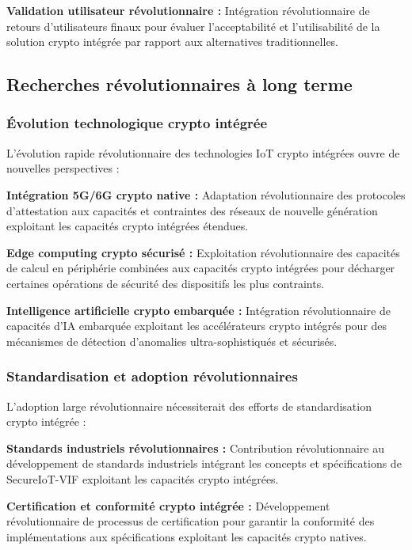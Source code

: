 \textbf{Validation utilisateur révolutionnaire :} Intégration révolutionnaire de retours d'utilisateurs finaux pour évaluer l'acceptabilité et l'utilisabilité de la solution crypto intégrée par rapport aux alternatives traditionnelles.

\subsection{Recherches révolutionnaires à long terme}

\subsubsection{Évolution technologique crypto intégrée}

L'évolution rapide révolutionnaire des technologies IoT crypto intégrées ouvre de nouvelles perspectives :

\textbf{Intégration 5G/6G crypto native :} Adaptation révolutionnaire des protocoles d'attestation aux capacités et contraintes des réseaux de nouvelle génération exploitant les capacités crypto intégrées étendues.

\textbf{Edge computing crypto sécurisé :} Exploitation révolutionnaire des capacités de calcul en périphérie combinées aux capacités crypto intégrées pour décharger certaines opérations de sécurité des dispositifs les plus contraints.

\textbf{Intelligence artificielle crypto embarquée :} Intégration révolutionnaire de capacités d'IA embarquée exploitant les accélérateurs crypto intégrés pour des mécanismes de détection d'anomalies ultra-sophistiqués et sécurisés.

\subsubsection{Standardisation et adoption révolutionnaires}

L'adoption large révolutionnaire nécessiterait des efforts de standardisation crypto intégrée :

\textbf{Standards industriels révolutionnaires :} Contribution révolutionnaire au développement de standards industriels intégrant les concepts et spécifications de SecureIoT-VIF exploitant les capacités crypto intégrées.

\textbf{Certification et conformité crypto intégrée :} Développement révolutionnaire de processus de certification pour garantir la conformité des implémentations aux spécifications exploitant les capacités crypto natives.

